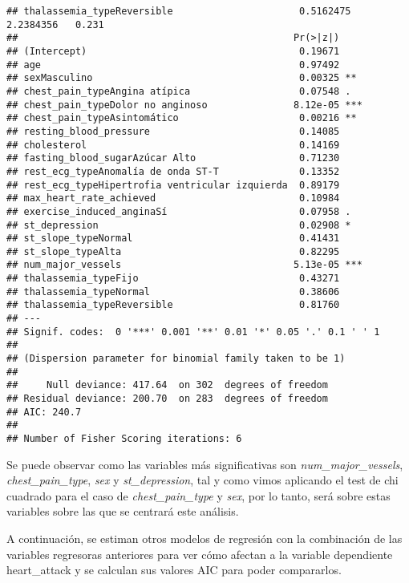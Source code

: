 \documentclass[
]{article}
\begin{document}
\begin{verbatim}
## thalassemia_typeReversible                      0.5162475  2.2384356   0.231
##                                                Pr(>|z|)    
## (Intercept)                                     0.19671    
## age                                             0.97492    
## sexMasculino                                    0.00325 ** 
## chest_pain_typeAngina atípica                   0.07548 .  
## chest_pain_typeDolor no anginoso               8.12e-05 ***
## chest_pain_typeAsintomático                     0.00216 ** 
## resting_blood_pressure                          0.14085    
## cholesterol                                     0.14169    
## fasting_blood_sugarAzúcar Alto                  0.71230    
## rest_ecg_typeAnomalía de onda ST-T              0.13352    
## rest_ecg_typeHipertrofia ventricular izquierda  0.89179    
## max_heart_rate_achieved                         0.10984    
## exercise_induced_anginaSí                       0.07958 .  
## st_depression                                   0.02908 *  
## st_slope_typeNormal                             0.41431    
## st_slope_typeAlta                               0.82295    
## num_major_vessels                              5.13e-05 ***
## thalassemia_typeFijo                            0.43271    
## thalassemia_typeNormal                          0.38606    
## thalassemia_typeReversible                      0.81760    
## ---
## Signif. codes:  0 '***' 0.001 '**' 0.01 '*' 0.05 '.' 0.1 ' ' 1
## 
## (Dispersion parameter for binomial family taken to be 1)
## 
##     Null deviance: 417.64  on 302  degrees of freedom
## Residual deviance: 200.70  on 283  degrees of freedom
## AIC: 240.7
## 
## Number of Fisher Scoring iterations: 6
\end{verbatim}

Se puede observar como las variables más significativas son
\emph{num\_major\_vessels}, \emph{chest\_pain\_type}, \emph{sex} y
\emph{st\_depression}, tal y como vimos aplicando el test de chi
cuadrado para el caso de \emph{chest\_pain\_type} y \emph{sex}, por lo
tanto, será sobre estas variables sobre las que se centrará este
análisis.

A continuación, se estiman otros modelos de regresión con la combinación
de las variables regresoras anteriores para ver cómo afectan a la
variable dependiente heart\_attack y se calculan sus valores AIC para
poder compararlos.
\end{document}
